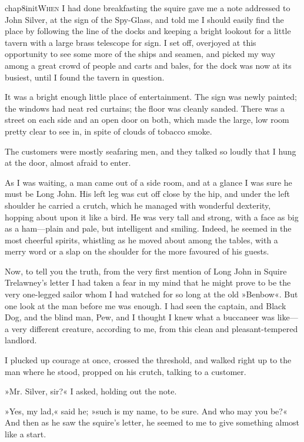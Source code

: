 
   \lettrine[lines=4,image=true]{chap8initW}{hen} I had done breakfasting the squire gave me a note addressed to John Silver, at the sign of the Spy-Glass, and told me I should easily find the place by following the line of the docks and keeping a bright lookout for a little tavern with a large brass telescope for sign. I set off, overjoyed at this opportunity to see some more of the ships and seamen, and picked my way among a great crowd of people and carts and bales, for the dock was now at its busiest, until I found the tavern in question.

It was a bright enough little place of entertainment. The sign was newly painted; the windows had neat red curtains; the floor was cleanly sanded. There was a street on each side and an open door on both, which made the large, low room pretty clear to see in, in spite of clouds of tobacco smoke.

The customers were mostly seafaring men, and they talked so loudly that I hung at the door, almost afraid to enter.

As I was waiting, a man came out of a side room, and at a glance I was sure he must be Long John. His left leg was cut off close by the hip, and under the left shoulder he carried a crutch, which he managed with wonderful dexterity, hopping about upon it like a bird. He was very tall and strong, with a face as big as a ham—plain and pale, but intelligent and smiling. Indeed, he seemed in the most cheerful spirits, whistling as he moved about among the tables, with a merry word or a slap on the shoulder for the more favoured of his guests.

Now, to tell you the truth, from the very first mention of Long John in Squire Trelawney's letter I had taken a fear in my mind that he might prove to be the very one-legged sailor whom I had watched for so long at the old »Benbow«. But one look at the man before me was enough. I had seen the captain, and Black Dog, and the blind man, Pew, and I thought I knew what a buccaneer was like—a very different creature, according to me, from this clean and pleasant-tempered landlord.

I plucked up courage at once, crossed the threshold, and walked right up to the man where he stood, propped on his crutch, talking to a customer.

»Mr. Silver, sir?« I asked, holding out the note.

»Yes, my lad,« said he; »such is my name, to be sure. And who may you be?« And then as he saw the squire's letter, he seemed to me to give something almost like a start.


